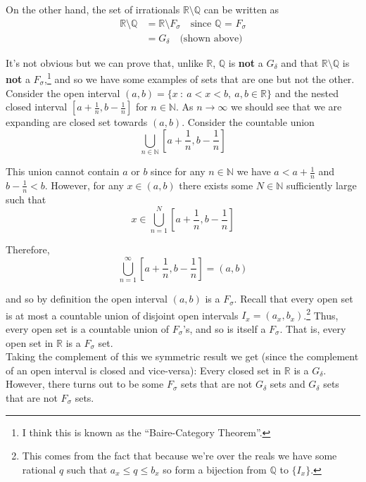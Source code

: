 \documentclass[12pt]{article}
\newlength\tindent
\renewcommand{\indent}{\hspace*{\tindent}}
\newcommand{\R}{\mathbb R}
\newcommand{\N}{\mathbb N}
\newcommand{\Q}{\mathbb Q}
\begin{document}
On the other hand, the set of irrationals $\R \setminus \Q$ can be written as
\begin{align*}
	\R \setminus \Q &= \R \setminus F_\sigma \quad \text{since $\Q$ = $F_\sigma$} \\
	&= G_\delta \quad \text{(shown above)}
\end{align*}

\indent It's not obvious but we can prove that, unlike $\R$, $\Q$ is {\bf not} a $G_\delta$ and that $\R \setminus \Q$ is {\bf not} a $F_\sigma$,\footnote{I think this is known as the ``Baire-Category Theorem''.} and so we have some examples of sets that are one but not the other. \\

\indent Consider the open interval $(a, b) = \{x ~:~ a < x < b,~ a,b \in \R\}$ and the nested closed interval $\left[ a + \frac{1}{n}, b - \frac{1}{n} \right]$ for $n \in \N$. As $n\to\infty$ we should see that we are expanding are closed set towards $(a, b)$. Consider the countable union
\begin{equation*}
	\bigcup_{n\in \N} \left[ a + \frac{1}{n}, b - \frac{1}{n} \right]
\end{equation*}

\indent This union cannot contain $a$ or $b$ since for any $n \in \N$ we have $a < a + \frac{1}{n}$ and $b - \frac{1}{n} < b$. However, for any $x \in (a, b)$ there exists some $N \in \N$ sufficiently large such that
\begin{equation*}
	x \in \bigcup^N_{n = 1} \left[ a + \frac{1}{n}, b - \frac{1}{n} \right]
\end{equation*}

Therefore,
\begin{equation*}
	\bigcup^\infty_{n = 1} \left[ a + \frac{1}{n}, b - \frac{1}{n} \right] = (a, b)
\end{equation*}

and so by definition the open interval $(a, b)$ is a $F_\sigma$. Recall that every open set is at most a countable union of disjoint open intervals $I_x = (a_x, b_x)$.\footnote{This comes from the fact that because we're over the reals we have some rational $q$ such that $a_x \leq q \leq b_x$ so form a bijection from $\Q$ to $\{I_x\}$.} Thus, every open set is a countable union of $F_\sigma$'s, and so is itself a $F_\sigma$. That is, every open set in $\R$ is a $F_\sigma$ set. \\

\indent Taking the complement of this we symmetric result we get (since the complement of an open interval is closed and vice-versa): Every closed set in $\R$ is a $G_\delta$. However, there turns out to be some $F_\sigma$ sets that are not $G_\delta$ sets and $G_\delta$ sets that are not $F_\sigma$ sets. \\
\end{document}

